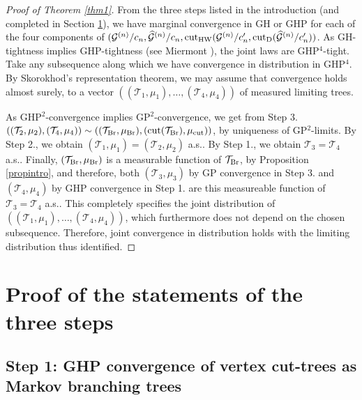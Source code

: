 \documentclass[11pt,a4paper]{article}
\newcommand{\cG}{\mathcal{G}}
\newcommand{\cT}{\mathcal{T}}
\begin{document}
\begin{proof}[Proof of Theorem \ref{thm1}] From the three steps listed in the introduction (and completed in Section \ref{secmain}), we have marginal convergence in GH or GHP for each of the four components of $(\cG^{(n)}/c_n,\widehat{\cG}^{(n)}/c_n,{\rm cut}_{\rm HW}(\cG^{(n)}/c_n^\prime,{\rm cut}_{\rm D}(\widehat{\cG}^{(n)}/c_n^\prime))$. As GH-tightness implies GHP-tightness (see Miermont
  \cite[Proposition 8]{Mie09}), the joint laws are GHP$^4$-tight. Take any subsequence along which we have convergence in distribution in GHP$^4$. By
  Skorokhod's representation theorem, we may assume that convergence holds almost surely, to a vector $((\cT_1,\mu_1),\ldots,(\cT_4,\mu_4))$ of measured limiting trees.
  
  As GHP$^2$-convergence implies GP$^2$-convergence, we get from Step 3.
  $((\cT_2,\mu_2),(\cT_4,\mu_4))\sim((\cT_{\rm Br},\mu_{\rm Br}),({\rm cut}(\cT_{\rm Br}),\mu_{\rm cut}))$, by uniqueness of GP$^2$-limits. By Step 2., we obtain
  $(\cT_1,\mu_1)=(\cT_2,\mu_2)$ a.s.. By Step 1., we obtain $\cT_3=\cT_4$ a.s.. Finally, $(\cT_{\rm Br},\mu_{\rm Br})$ is a measurable function of $\cT_{\rm Br}$, by Proposition \ref{propintro}, and therefore, both $(\cT_3,\mu_3)$ by GP convergence in Step 3. and $(\cT_4,\mu_4)$ by GHP convergence in Step 1. are this measureable function of
  $\cT_3=\cT_4$ a.s.. This completely specifies the joint distribution of $((\cT_1,\mu_1),\ldots,(\cT_4,\mu_4))$, which furthermore does not depend on the chosen subsequence.
  Therefore, joint convergence in distribution holds with the limiting distribution thus identified.
\end{proof}

\section{Proof of the statements of the three steps }\label{secmain}

\subsection{Step 1: GHP convergence of vertex cut-trees as Markov branching trees}\label{sec3.1}
\end{document}
